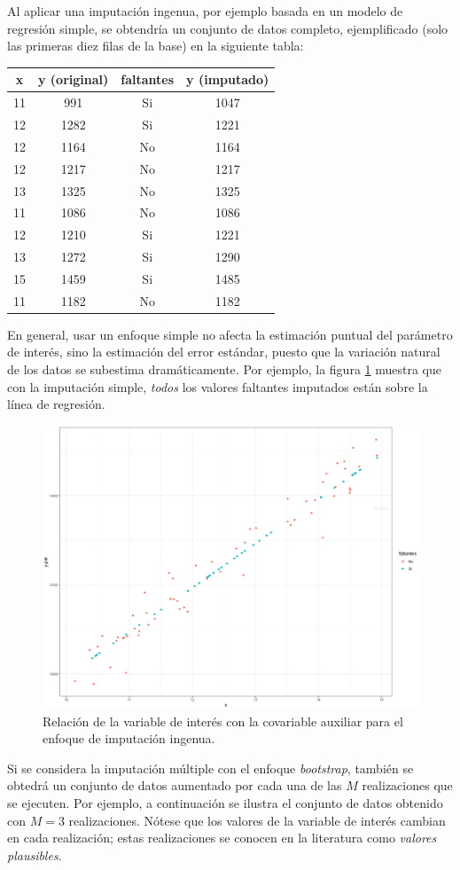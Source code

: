 \documentclass[
  12pt,
  spanish,
]{book}
\begin{document}
Al aplicar una imputación ingenua, por ejemplo basada en un modelo de regresión simple, se obtendría un conjunto de datos completo, ejemplificado (solo las primeras diez filas de la base) en la siguiente tabla:

\begin{longtable}[]{@{}cccc@{}}
\toprule
x & y (original) & faltantes & y (imputado) \\
\midrule
\endhead
11 & 991 & Si & 1047 \\
12 & 1282 & Si & 1221 \\
12 & 1164 & No & 1164 \\
12 & 1217 & No & 1217 \\
13 & 1325 & No & 1325 \\
11 & 1086 & No & 1086 \\
12 & 1210 & Si & 1221 \\
13 & 1272 & Si & 1290 \\
15 & 1459 & Si & 1485 \\
11 & 1182 & No & 1182 \\
\bottomrule
\end{longtable}

En general, usar un enfoque simple no afecta la estimación puntual del parámetro de interés, sino la estimación del error estándar, puesto que la variación natural de los datos se subestima dramáticamente. Por ejemplo, la figura \ref{fig:figim2} muestra que con la imputación simple, \emph{todos} los valores faltantes imputados están sobre la línea de regresión.

\begin{figure}
\includegraphics[width=0.5\linewidth]{Pics/im2} \caption{Relación de la variable de interés con la covariable auxiliar para el enfoque de imputación ingenua.}\label{fig:figim2}
\end{figure}

Si se considera la imputación múltiple con el enfoque \emph{bootstrap}, también se obtedrá un conjunto de datos aumentado por cada una de las \(M\) realizaciones que se ejecuten. Por ejemplo, a continuación se ilustra el conjunto de datos obtenido con \(M=3\) realizaciones. Nótese que los valores de la variable de interés cambian en cada realización; estas realizaciones se conocen en la literatura como \emph{valores plausibles}.
\end{document}
